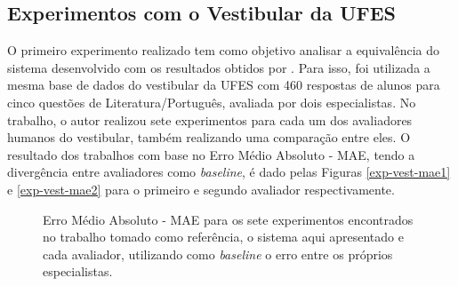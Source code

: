 \subsection{Experimentos com o Vestibular da UFES}
O primeiro experimento realizado tem como objetivo analisar a equivalência do sistema desenvolvido com os resultados obtidos por . Para isso, foi utilizada a mesma base de dados do vestibular da UFES com 460 respostas de alunos para cinco questões de Literatura/Português, avaliada por dois especialistas. No trabalho, o autor realizou sete experimentos para cada um dos avaliadores humanos do vestibular, também realizando uma comparação entre eles. O resultado dos trabalhos com base no Erro Médio Absoluto - MAE, tendo a divergência entre avaliadores como \textit{baseline}, é dado pelas Figuras \ref{exp-vest-mae1} e \ref{exp-vest-mae2} para o primeiro e segundo avaliador respectivamente.

\begin{figure}[ht]
\centering
{}


\caption{Erro Médio Absoluto - MAE para os sete experimentos encontrados no trabalho tomado como referência, o sistema aqui apresentado e cada avaliador, utilizando como \textit{baseline} o erro entre os próprios especialistas.}
\end{figure}

